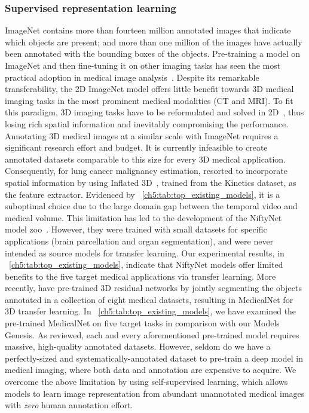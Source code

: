 \subsubsection{Supervised representation learning} 


ImageNet contains more than fourteen million annotated images that indicate which objects are present; and more than one million of the images have actually been annotated with the bounding boxes of the objects. Pre-training a model on ImageNet and then fine-tuning it on other imaging tasks has seen the most practical adoption in medical image analysis~\citep{bar2015chest,shin2016deep,tajbakhsh2016convolutional}. Despite its remarkable transferability, the 2D ImageNet model offers little benefit towards 3D medical imaging tasks in the most prominent medical modalities (\eg CT and MRI). To fit this paradigm, 3D imaging tasks have to be reformulated and solved in 2D~\citep{roth2015improving,roth2014new,tajbakhsh2015computer}, thus losing rich spatial information and inevitably compromising the performance. Annotating 3D medical images at a similar scale with ImageNet requires a significant research effort and budget. It is currently infeasible to create annotated datasets comparable to this size for every 3D medical application. 
Consequently, for lung cancer malignancy estimation, \citet{ardila2019end} resorted to incorporate spatial information by using Inflated 3D~\citep{carreira2017quo}, trained from the Kinetics dataset, as the feature extractor. Evidenced by \tablename~\ref{ch5:tab:top_existing_models}, it is a suboptimal choice due to the large domain gap between the temporal video and medical volume. This limitation has led to the development of the NiftyNet model zoo~\citep{gibson2018niftynet}. However, they were trained with small datasets for specific applications (\eg brain parcellation and organ segmentation), and were never intended as source models for transfer learning. Our experimental results, in \tablename~\ref{ch5:tab:top_existing_models}, indicate that NiftyNet models offer limited benefits to the five target medical applications via transfer learning. More recently, \citet{chen2019med3d} have pre-trained 3D residual networks by jointly segmenting the objects annotated in a collection of eight medical datasets, resulting in MedicalNet for 3D transfer learning. In \tablename~\ref{ch5:tab:top_existing_models}, we have examined the pre-trained MedicalNet on five target tasks in comparison with our Models Genesis. As reviewed, each and every aforementioned pre-trained model requires massive, high-quality annotated datasets. However, seldom do we have a perfectly-sized and systematically-annotated dataset to pre-train a deep model in medical imaging, where both data and annotation are expensive to acquire. We overcome the above limitation by using self-supervised learning, which allows models to learn image representation from abundant unannotated medical images with {\em zero} human annotation effort.

